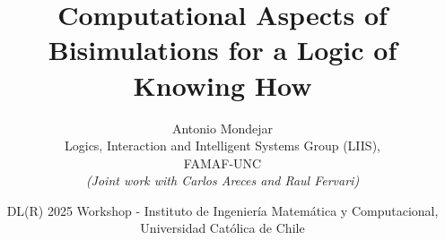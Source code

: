 \documentclass{beamer}
\begin{document}


 
\title[Computational Aspects of Bisimulations for a Logic of Knowing How]{Computational Aspects of Bisimulations for a Logic of Knowing How}%
\author[Antonio Mondejar]
		{{\small Antonio Mondejar}  \\ {\tiny Logics, Interaction and Intelligent Systems Group (LIIS), \\  FAMAF-UNC }
        \\
        {\tiny \emph{(Joint work with Carlos Areces and Raul Fervari)}} \\
        \bigskip
}

\date[DL(R) 2025 Workshop]
{ \tiny{DL(R) 2025 Workshop - Instituto de Ingeniería Matemática y Computacional, 
        Universidad Católica de Chile}}


\begin{frame}
\titlepage
\end{frame}


\end{document}
